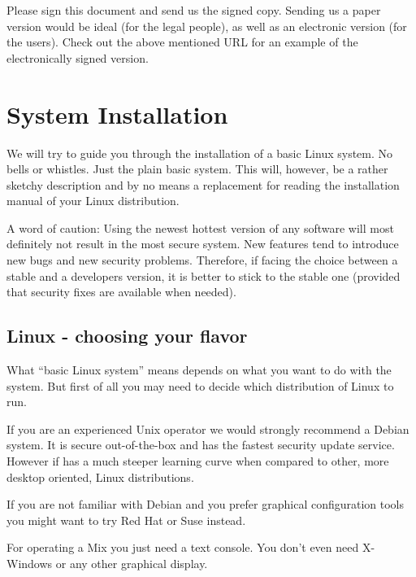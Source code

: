 \documentclass{article}
\begin{document}
Please sign this document and send us the signed copy. Sending us a paper
version would be ideal (for the legal people), as well as an
electronic version (for the users). Check out the above mentioned URL
for an example of the electronically signed version.


\section{System Installation}
\label{sys_install}

We will try to guide you through the installation of a basic Linux
system. No bells or whistles. Just the plain basic system. This will,
however, be a rather sketchy description and by no means a replacement
for reading the installation manual of your Linux distribution.

A word of caution: Using the newest hottest version of any software
will most definitely not result in the most secure system. New
features tend to introduce new bugs and new security problems.
Therefore, if facing the choice between a stable and a developers
version, it is better to stick to the stable one (provided that
security fixes are available when needed).


\subsection{Linux - choosing your flavor}

What ``basic Linux system'' means depends on what you want to do with
the system. But first of all you may need to decide which distribution
of Linux to run.

If you are an experienced Unix operator we would strongly recommend a
Debian system. It is secure out-of-the-box and has the fastest
security update service. However if has a much steeper learning curve
when compared to other, more desktop oriented, Linux distributions.

If you are not familiar with Debian and you prefer graphical
configuration tools you might want to try Red Hat or Suse instead.

For operating a Mix you just need a text console. You don't even need
X-Windows or any other graphical display. 
\end{document}
